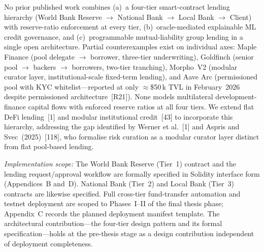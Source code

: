 \documentclass[12pt,a4paper]{report}
\begin{document}
\begin{description}[leftmargin=0pt]

\item[\textbf{Contribution 1 --- Four-Tier Hierarchical DeFi Architecture.}]
No prior published work combines (a)~a four-tier smart-contract lending hierarchy (World Bank Reserve $\to$ National Bank $\to$ Local Bank $\to$ Client) with reserve-ratio enforcement at every tier, (b)~oracle-mediated explainable ML credit governance, and (c)~programmable mutual-liability group lending in a single open architecture. Partial counterexamples exist on individual axes: Maple Finance (pool delegate $\to$ borrower, three-tier underwriting), Goldfinch (senior pool $\to$ backers $\to$ borrowers, two-tier tranching), Morpho~V2 (modular curator layer, institutional-scale fixed-term lending), and Aave Arc (permissioned pool with KYC whitelist---reported at only $\approx$\$50\,k TVL in February~2026 despite permissioned architecture~[R21]). None models multilateral development-finance capital flows with enforced reserve ratios at all four tiers. We extend flat DeFi lending~[1] and modular institutional credit~[43] to incorporate this hierarchy, addressing the gap identified by Werner et al.~[1] and Aspris and Svec~(2025)~[118], who formalise risk curation as a modular curator layer distinct from flat pool-based lending.

\textit{Implementation scope:} The World Bank Reserve (Tier~1) contract and the lending request/approval workflow are formally specified in Solidity interface form (Appendices~B and~D). National Bank (Tier~2) and Local Bank (Tier~3) contracts are likewise specified. Full cross-tier fund-transfer automation and testnet deployment are scoped to Phases~I--II of the final thesis phase; Appendix~C records the planned deployment manifest template. The architectural contribution---the four-tier design pattern and its formal specification---holds at the pre-thesis stage as a design contribution independent of deployment completeness.


\end{description}
\end{document}
